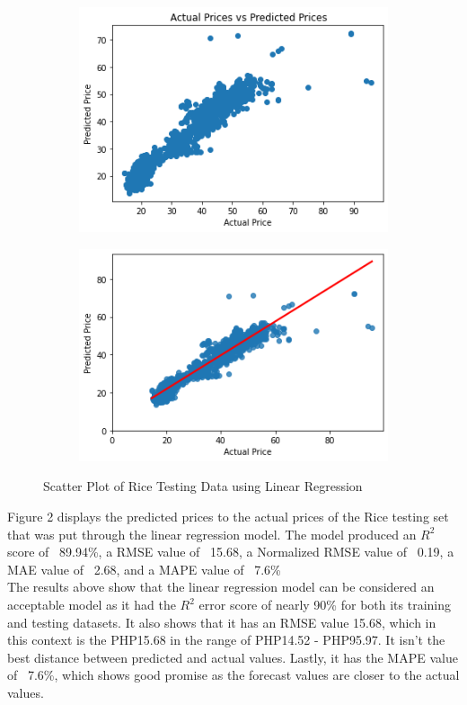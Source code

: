\documentclass[runningheads]{llncs}
\begin{document}
\begin{figure}
	\begin{subfigure}{.5\textwidth}
		\centering
		\includegraphics[width=.8\linewidth]{FIGURES/lin_test1.png}
		
	\end{subfigure}%
	\begin{subfigure}{.5\textwidth}
		\centering
		\includegraphics[width=.8\linewidth]{FIGURES/lin_test2.png}
		
	\end{subfigure}
	\caption{Scatter Plot of Rice Testing Data using Linear Regression}
\end{figure}

Figure 2 displays the predicted prices to the actual prices of the Rice testing set that was put through the linear regression model. The model produced an $R^2$ score of ~89.94\%, a RMSE value of ~15.68, a Normalized RMSE value of ~0.19, a MAE value of ~2.68, and a MAPE value of ~7.6\% \\

The results above show that the linear regression model can be considered an acceptable model as it had the $R^2$ error score of nearly 90\% for both its training and testing datasets. It also shows that it has an RMSE value 15.68, which in this context is the PHP15.68 in the range of PHP14.52 - PHP95.97. It isn’t the best distance between predicted and actual values. Lastly, it has the MAPE value of ~7.6\%, which shows good promise as the forecast values are closer to the actual values.
\end{document}
